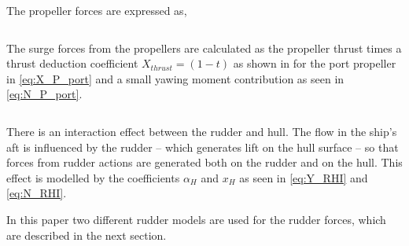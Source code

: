 \begin{equation}
    \label{eq:N_H}
    
\end{equation}

The propeller forces are expressed as,
\begin{equation}
    \label{eq:X_P}
    
\end{equation}

\begin{equation}
    \label{eq:Y_P}
    
\end{equation}

\begin{equation}
    \label{eq:N_P}
    
\end{equation}
The surge forces from the propellers are calculated as the propeller thrust times a thrust deduction coefficient $X_{thrust}=(1-t)$ as shown in for the port propeller in \autoref{eq:X_P_port} and a small yawing moment contribution as seen in \autoref{eq:N_P_port}.
\begin{equation}
    \label{eq:X_P_port}
    
\end{equation}

\begin{equation}
    \label{eq:N_P_port}
    
\end{equation}

There is an interaction effect between the rudder and hull. The flow in the ship's aft is influenced by the rudder -- which generates lift on the hull surface -- so that forces from rudder actions are generated both on the rudder and on the hull. This effect is modelled by the coefficients $\alpha_H$ and $x_H$ as seen in \autoref{eq:Y_RHI} and \autoref{eq:N_RHI}.
\begin{equation}
    \label{eq:Y_RHI}
    
\end{equation}

\begin{equation}
    \label{eq:N_RHI}
    
\end{equation}
In this paper two different rudder models are used for the rudder forces, which are described in the next section.